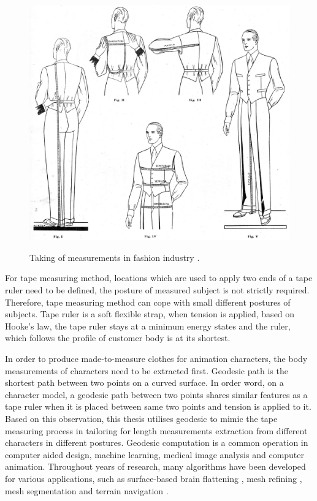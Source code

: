 \begin{figure}[H]
    \centering
	\includegraphics[width=0.95\columnwidth]{../images/ItalianTailoringTerms4b}\\[1cm]
    \caption{Taking of measurements in fashion industry .}
    \label{figure:taking_of_measurements}
\end{figure}


For tape measuring method, locations which are used to apply two ends of a tape ruler need to be defined, the posture of measured subject is not strictly required. Therefore, tape measuring method can cope with small different postures of subjects. Tape ruler is a soft flexible strap, when tension is applied, based on Hooke's law, the tape ruler stays at a minimum energy states and the ruler, which follows the profile of customer body is at its shortest. 

In order to produce made-to-measure clothes for animation characters, the body measurements of characters need to be extracted first. Geodesic path is the shortest path between two points on a curved surface. In order word, on a character model, a geodesic path between two points shares similar features as a tape ruler when it is placed between same two points and tension is applied to it. Based on this observation, this thesis utilises geodesic to mimic the tape measuring process in tailoring for length measurements extraction from different characters in different postures. Geodesic computation is a common operation in computer aided design, machine learning, medical image analysis and computer animation. Throughout years of research, many algorithms have been developed for various applications, such as surface-based brain flattening , mesh refining , mesh segmentation  and terrain navigation . 

